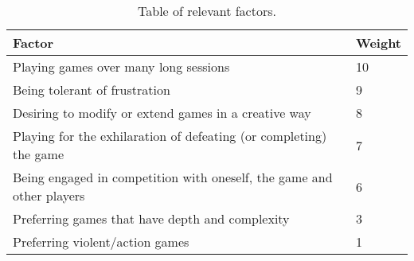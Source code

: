\begin{table}[h]
\begin{tabular}{|l|l|}
\hline
\rowcolor[HTML]{C0C0C0} 
Factor                                                                & Weight  \\ \hline
Playing games over many long sessions                                 & 10     	\\ \hline
Being tolerant of frustration                                         & 9       \\ \hline
Desiring to modify or extend games in a creative way                  & 8       \\ \hline
Playing for the exhilaration of defeating (or completing) the game    & 7       \\ \hline
Being engaged in competition with oneself, the game and other players & 6       \\ \hline
Preferring games that have depth and complexity                       & 3       \\ \hline
Preferring violent/action games                                       & 1       \\ \hline
\end{tabular}
\label{tab:relevantFactors}
\caption{Table of relevant factors.}
\end{table}